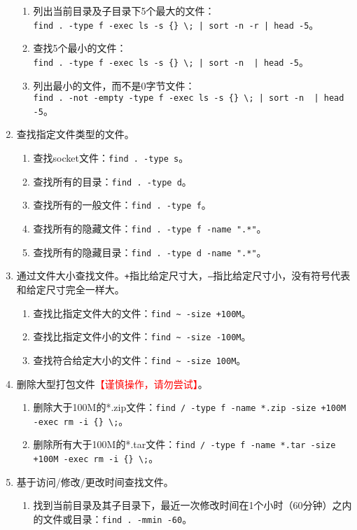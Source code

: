 \begin{enumerate}
\begin{enumerate}
      \item 列出当前目录及子目录下5个最大的文件：\\ \verb=find . -type f -exec ls -s {} \; | sort -n -r | head -5=。
      \item 查找5个最小的文件：\\ \verb=find . -type f -exec ls -s {} \; | sort -n  | head -5=。
      \item 列出最小的文件，而不是0字节文件：\\ \verb=find . -not -empty -type f -exec ls -s {} \; | sort -n  | head -5=。
    \end{enumerate}
  \item 查找指定文件类型的文件。
    \begin{enumerate}
      \item 查找socket文件：\verb|find . -type s|。
      \item 查找所有的目录：\verb|find . -type d|。
      \item 查找所有的一般文件：\verb|find . -type f|。
      \item 查找所有的隐藏文件：\verb|find . -type f -name ".*"|。
      \item 查找所有的隐藏目录：\verb|find . -type d -name ".*"|。
    \end{enumerate}
  \item 通过文件大小查找文件。\verb|+|指比给定尺寸大，\verb|–|指比给定尺寸小，没有符号代表和给定尺寸完全一样大。 
    \begin{enumerate}
      \item 查找比指定文件大的文件：\verb|find ~ -size +100M|。
      \item 查找比指定文件小的文件：\verb|find ~ -size -100M|。
      \item 查找符合给定大小的文件：\verb|find ~ -size 100M|。
    \end{enumerate}
  \item 删除大型打包文件\textcolor{red}{【谨慎操作，请勿尝试】}。
    \begin{enumerate}
      \item 删除大于100M的*.zip文件：\verb|find / -type f -name *.zip -size +100M -exec rm -i {} \;|。
      \item 删除所有大于100M的*.tar文件：\verb|find / -type f -name *.tar -size +100M -exec rm -i {} \;|。
    \end{enumerate}
  \item 基于访问/修改/更改时间查找文件。
    \begin{enumerate}
      \item 找到当前目录及其子目录下，最近一次修改时间在1个小时（60分钟）之内的文件或目录：\verb|find . -mmin -60|。

\end{enumerate}
\end{enumerate}
